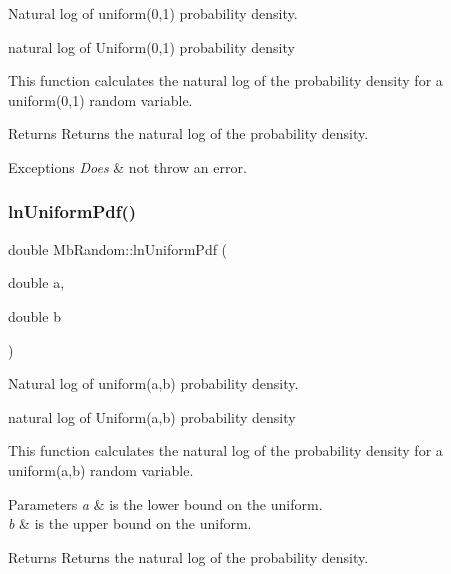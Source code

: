 Natural log of uniform(0,1) probability density. 

natural log of Uniform(0,1) probability density

This function calculates the natural log of the probability density for a uniform(0,1) random variable.

\begin{DoxyReturn}{Returns}
Returns the natural log of the probability density. 
\end{DoxyReturn}

\begin{DoxyExceptions}{Exceptions}
{\em Does} & not throw an error. \\
\hline
\end{DoxyExceptions}
\mbox{\label{class_mb_random_ae9126d13b2ea42cc8f51ec8e400a2ba0}} 
\subsubsection{\texorpdfstring{lnUniformPdf()}{lnUniformPdf()}\hspace{0.1cm}{\footnotesize\ttfamily [2/2]}}
{\footnotesize\ttfamily double Mb\+Random\+::ln\+Uniform\+Pdf (\begin{DoxyParamCaption}\item[{double}]{a,  }\item[{double}]{b }\end{DoxyParamCaption})\hspace{0.3cm}{\ttfamily [inline]}}



Natural log of uniform(a,b) probability density. 

natural log of Uniform(a,b) probability density

This function calculates the natural log of the probability density for a uniform(a,b) random variable.


\begin{DoxyParams}{Parameters}
{\em a} & is the lower bound on the uniform. \\
\hline
{\em b} & is the upper bound on the uniform. \\
\hline
\end{DoxyParams}
\begin{DoxyReturn}{Returns}
Returns the natural log of the probability density. 
\end{DoxyReturn}

